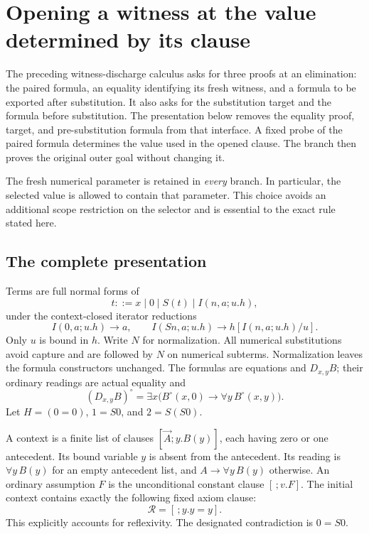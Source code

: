
\section{Opening a witness at the value determined by its clause}
\label{ao:main}

The preceding witness-discharge calculus asks for three proofs at an
elimination: the paired formula, an equality identifying its fresh witness,
and a formula to be exported after substitution.  It also asks for the
substitution target and the formula before substitution.  The presentation
below removes the equality proof, target, and pre-substitution formula from
that interface.  A fixed probe of the paired formula determines the value
used in the opened clause.  The branch then proves the original outer goal
without changing it.

The fresh numerical parameter is retained in \emph{every} branch.  In
particular, the selected value is allowed to contain that parameter.  This
choice avoids an additional scope restriction on the selector and is
essential to the exact rule stated here.

\subsection{The complete presentation}

Terms are full normal forms of
\[
 t::=x\mid0\mid S(t)\mid I(n,a;u.h),
\]
under the context-closed iterator reductions
\[
 I(0,a;u.h)\longrightarrow a,
 \qquad
 I(Sn,a;u.h)\longrightarrow h[I(n,a;u.h)/u].
\]
Only $u$ is bound in $h$.  Write $N$ for normalization.  All numerical
substitutions avoid capture and are followed by $N$ on numerical subterms.
Normalization leaves the formula constructors unchanged.  The formulas
are equations and $D_{x,y}B$; their ordinary readings are actual equality
and
\[
 (D_{x,y}B)^\circ
     =\exists x\bigl(B^\circ(x,0)\to\forall y\,B^\circ(x,y)\bigr).
\]
Let $H=(0=0)$, $1=S0$, and $2=S(S0)$.

A context is a finite list of clauses $[\vec A;y.B(y)]$, each having
zero or one antecedent.  Its bound variable $y$ is absent from the
antecedent.  Its reading is $\forall y\,B(y)$ for an empty antecedent
list, and $A\to\forall y\,B(y)$ otherwise.  An ordinary assumption $F$
is the unconditional constant clause $[\,;v.F]$.  The initial context
contains exactly the following fixed axiom clause:
\[
                 \mathcal R=[\,;y.y=y].
 \tag{Ax}\label{ao:axiom}
\]
This explicitly accounts for reflexivity.  The designated contradiction is
$0=S0$.

